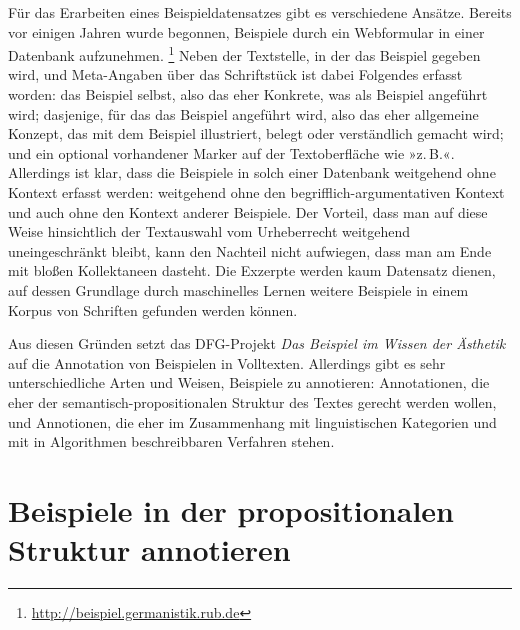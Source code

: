 \documentclass{article}
\begin{document}

Für das Erarbeiten eines Beispieldatensatzes gibt es verschiedene
Ansätze. Bereits vor einigen Jahren wurde begonnen, Beispiele durch
ein Webformular in einer Datenbank aufzunehmen.%
\footnote{\url{http://beispiel.germanistik.rub.de}} %
Neben der Textstelle, in der das Beispiel gegeben wird, und
Meta-Angaben über das Schriftstück ist dabei Folgendes erfasst worden:
das Beispiel selbst, also das eher Konkrete, was als Beispiel
angeführt wird; dasjenige, für das das Beispiel angeführt wird, also
das eher allgemeine Konzept, das mit dem Beispiel illustriert, belegt
oder verständlich gemacht wird; und ein optional vorhandener Marker
auf der Textoberfläche wie »z.\,B.«. Allerdings ist klar, dass die
Beispiele in solch einer Datenbank weitgehend ohne Kontext erfasst
werden: weitgehend ohne den begrifflich-argumentativen Kontext und
auch ohne den Kontext anderer Beispiele. Der Vorteil, dass man auf
diese Weise hinsichtlich der Textauswahl vom Urheberrecht weitgehend
uneingeschränkt bleibt, kann den Nachteil nicht aufwiegen, dass man am
Ende mit bloßen Kollektaneen dasteht. Die Exzerpte werden kaum
Datensatz dienen, auf dessen Grundlage durch maschinelles Lernen
weitere Beispiele in einem Korpus von Schriften gefunden werden
können.

Aus diesen Gründen setzt das DFG-Projekt \textit{Das Beispiel im
  Wissen der Ästhetik} auf die Annotation von Beispielen in
Volltexten. Allerdings gibt es sehr unterschiedliche Arten und Weisen,
Beispiele zu annotieren: Annotationen, die eher der
semantisch-propositionalen Struktur des Textes gerecht werden wollen,
und Annotionen, die eher im Zusammenhang mit linguistischen Kategorien
und mit in Algorithmen beschreibbaren Verfahren stehen.

\section{Beispiele in der propositionalen Struktur annotieren}
\end{document}
